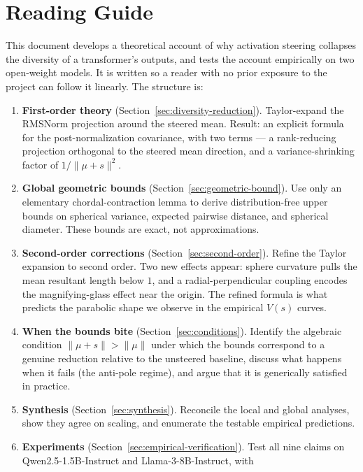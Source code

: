 \section*{Reading Guide}
\label{sec:walk-guide}

This document develops a theoretical account of why activation steering
collapses the diversity of a transformer's outputs, and tests the
account empirically on two open-weight models. It is written so a reader
with no prior exposure to the project can follow it linearly. The
structure is:

\begin{enumerate}
  \item \textbf{First-order theory} (Section~\ref{sec:diversity-reduction}).
    Taylor-expand the RMSNorm projection around the steered mean. Result: an
    explicit formula for the post-normalization covariance, with two terms ---
    a rank-reducing projection orthogonal to the steered mean direction, and a
    variance-shrinking factor of $1/\|\mu+s\|^2$.
  \item \textbf{Global geometric bounds} (Section~\ref{sec:geometric-bound}).
    Use only an elementary chordal-contraction lemma to derive distribution-free
    upper bounds on spherical variance, expected pairwise distance, and
    spherical diameter. These bounds are exact, not approximations.
  \item \textbf{Second-order corrections} (Section~\ref{sec:second-order}).
    Refine the Taylor expansion to second order. Two new effects appear: sphere
    curvature pulls the mean resultant length below $1$, and a radial-perpendicular
    coupling encodes the magnifying-glass effect near the origin. The refined
    formula is what predicts the parabolic shape we observe in the empirical
    $V(s)$ curves.
  \item \textbf{When the bounds bite} (Section~\ref{sec:conditions}).
    Identify the algebraic condition $\|\mu+s\| > \|\mu\|$ under which the
    bounds correspond to a genuine reduction relative to the unsteered baseline,
    discuss what happens when it fails (the anti-pole regime), and argue that
    it is generically satisfied in practice.
  \item \textbf{Synthesis} (Section~\ref{sec:synthesis}).
    Reconcile the local and global analyses, show they agree on scaling, and
    enumerate the testable empirical predictions.
  \item \textbf{Experiments} (Section~\ref{sec:empirical-verification}).
    Test all nine claims on Qwen2.5-1.5B-Instruct and Llama-3-8B-Instruct, with

\end{enumerate}
